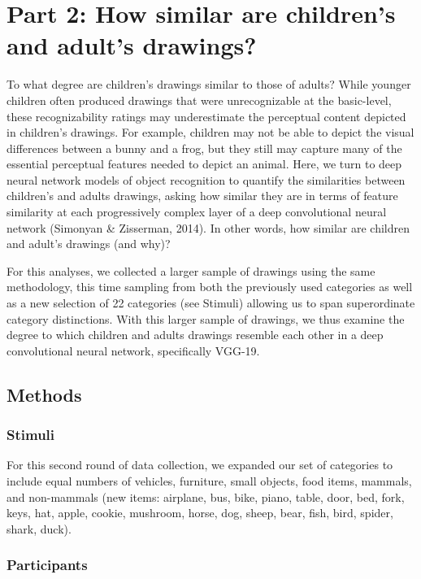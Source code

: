 \documentclass[10pt, letterpaper]{article}
\begin{document}
\section{Part 2: How similar are children's and adult's
drawings?}\label{part-2-how-similar-are-childrens-and-adults-drawings}

To what degree are children's drawings similar to those of adults? While
younger children often produced drawings that were unrecognizable at the
basic-level, these recognizability ratings may underestimate the
perceptual content depicted in children's drawings. For example,
children may not be able to depict the visual differences between a
bunny and a frog, but they still may capture many of the essential
perceptual features needed to depict an animal. Here, we turn to deep
neural network models of object recognition to quantify the similarities
between children's and adults drawings, asking how similar they are in
terms of feature similarity at each progressively complex layer of a
deep convolutional neural network (Simonyan \& Zisserman, 2014). In
other words, how similar are children and adult's drawings (and why)?

For this analyses, we collected a larger sample of drawings using the
same methodology, this time sampling from both the previously used
categories as well as a new selection of 22 categories (see Stimuli)
allowing us to span superordinate category distinctions. With this
larger sample of drawings, we thus examine the degree to which children
and adults drawings resemble each other in a deep convolutional neural
network, specifically VGG-19.

\subsection{Methods}\label{methods-1}

\subsubsection{Stimuli}\label{stimuli-1}

For this second round of data collection, we expanded our set of
categories to include equal numbers of vehicles, furniture, small
objects, food items, mammals, and non-mammals (new items: airplane, bus,
bike, piano, table, door, bed, fork, keys, hat, apple, cookie, mushroom,
horse, dog, sheep, bear, fish, bird, spider, shark, duck).

\subsubsection{Participants}\label{participants-1}
\end{document}
